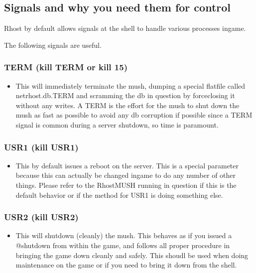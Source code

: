 \documentclass[letterpaper,10pt,english]{sphinxmanual}
\begin{document}
\subsection{Signals and why you need them for control}
\label{\detokenize{maintenance:signals-and-why-you-need-them-for-control}}
\sphinxAtStartPar
Rhost by default allows signals at the shell to handle various processes in\sphinxhyphen{}game.

\sphinxAtStartPar
The following signals are useful.


\subsubsection{TERM (kill \sphinxhyphen{}TERM or kill \sphinxhyphen{}15)}
\label{\detokenize{maintenance:term-kill-term-or-kill-15}}\begin{itemize}
\item {} 
\sphinxAtStartPar
This will immediately terminate the mush, dumping a special flatfile called
netrhost.db.TERM and scramming the db in question by force\sphinxhyphen{}closing it
without any writes.  A TERM is the effort for the mush to shut down the
mush as fast as possible to avoid any db corruption if possible since
a TERM signal is common during a server shutdown, so time is paramount.

\end{itemize}


\subsubsection{USR1 (kill \sphinxhyphen{}USR1)}
\label{\detokenize{maintenance:usr1-kill-usr1}}\begin{itemize}
\item {} 
\sphinxAtStartPar
This by default issues a reboot on the server.  This is a special parameter
because this can actually be changed in\sphinxhyphen{}game to do any number of other
things.  Please refer to the RhostMUSH running in question if this is
the default behavior or if the method for USR1 is doing something else.

\end{itemize}


\subsubsection{USR2 (kill \sphinxhyphen{}USR2)}
\label{\detokenize{maintenance:usr2-kill-usr2}}\begin{itemize}
\item {} 
\sphinxAtStartPar
This will shutdown (cleanly) the mush.  This behaves as if you issued
a @shutdown from within the game, and follows all proper procedure
in bringing the game down cleanly and safely.  This shoudl be used
when doing maintenance on the game or if you need to bring it down
from the shell.

\end{itemize}
\end{document}
